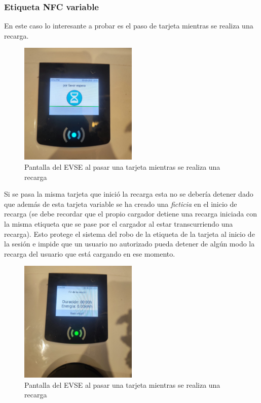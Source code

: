 \documentclass[12pt,a4paper,onecolumn,oneside]{report}
\begin{document}
\subsubsection{Etiqueta NFC variable}

En este caso lo interesante a probar es el paso de tarjeta mientras se realiza una recarga.

\begin{figure}[H] 
\centering
  \includegraphics[width=0.5\textwidth]{figuras/prueba5.png}
  \caption[Pantalla del EVSE al pasar una tarjeta mientras se realiza una recarga]{Pantalla del EVSE al pasar una tarjeta mientras se realiza una recarga\\
  }
  \label{fig:prueba5}
\end{figure}

Si se pasa la misma tarjeta que inició la recarga esta no se debería detener dado que además de esta tarjeta variable se ha creado una \textit{ficticia} en el inicio de recarga (se debe recordar que el propio cargador detiene una recarga iniciada con la misma etiqueta que se pase por el cargador al estar transcurriendo una recarga). Esto protege el sistema del robo de la etiqueta de la tarjeta al inicio de la sesión e impide que un usuario no autorizado pueda detener de algún modo la recarga del usuario que está cargando en ese momento. 

\begin{figure}[H] 
\centering
  \includegraphics[width=0.5\textwidth]{figuras/prueba6.png}
  \caption[Pantalla del EVSE al pasar una tarjeta mientras se realiza una recarga]{Pantalla del EVSE al pasar una tarjeta mientras se realiza una recarga\\
  }
  \label{fig:prueba6}
\end{figure}
\end{document}
